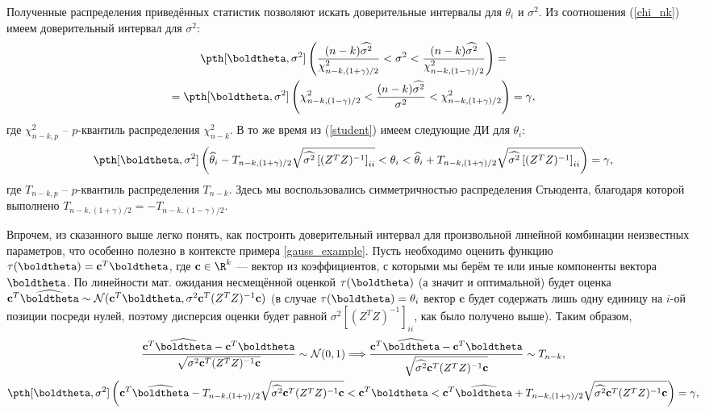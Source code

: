 Полученные распределения приведённых статистик позволяют искать доверительные интервалы для $\theta_i$ и $\sigma^2$. Из соотношения (\ref{chi_nk}) имеем доверительный интервал для $\sigma^2$:
\begin{gather*}
    \pth[\boldtheta, \sigma^2]\left(\frac{(n-k)\widehat{\sigma^2}}{\chi^2_{n-k, (1+\gamma)/2}} < \sigma^2 < \frac{(n-k)\widehat{\sigma^2}}{\chi^2_{n-k, (1-\gamma)/2}} \right) = \\
    = \pth[\boldtheta, \sigma^2]\left(\chi^2_{n-k, (1-\gamma)/2} < \frac{(n-k)\widehat{\sigma^2}}{\sigma^2} < \chi^2_{n-k, (1+\gamma)/2} \right)=\gamma,
\end{gather*}
где $\chi^2_{n-k, p}$ -- $p$-квантиль распределения $\chi^2_{n-k}$. В то же время из (\ref{student}) имеем следующие ДИ для $\theta_i$:
\begin{gather*}
    \pth[\boldtheta, \sigma^2]\left(\widehat{\theta}_i - T_{n-k,(1+\gamma)/2}\sqrt{\widehat{\sigma^2}\left[(Z^T Z)^{-1}\right]_{ii}} < \theta_i < \widehat{\theta}_i + T_{n-k, (1+\gamma)/2}\sqrt{\widehat{\sigma^2}\left[(Z^T Z)^{-1}\right]_{ii}} \right) =\gamma,
\end{gather*}
где $T_{n-k, p}$ -- $p$-квантиль распределения $T_{n-k}$. Здесь мы воспользовались симметричностью распределения Стьюдента, благодаря которой выполнено $T_{n-k, (1+\gamma)/2} = -T_{n-k, (1-\gamma)/2}$.

Впрочем, из сказанного выше легко понять, как построить доверительный интервал для произвольной линейной комбинации неизвестных параметров, что особенно полезно в контексте примера \ref{gauss_example}. Пусть необходимо оценить функцию $\tau(\boldtheta) = \mathbf c^T\boldtheta$, где $\mathbf c \in \R^k$ --- вектор из коэффициентов, с которыми мы берём те или иные компоненты вектора $\boldtheta$. По линейности мат. ожидания несмещённой оценкой $\tau(\boldtheta)$ (а значит и оптимальной) будет оценка $\mathbf c^T\widehat{\boldtheta} \sim \mathcal{N}(\mathbf c^T\boldtheta, \sigma^2 \mathbf c^T (Z^TZ)^{-1}\mathbf c)$ (в случае $\tau(\boldtheta) = \theta_i$ вектор $\mathbf c$ будет содержать лишь одну единицу на $i$-ой позиции посреди нулей, поэтому дисперсия оценки будет равной $\sigma^2\left[(Z^T Z)^{-1}\right]_{ii}$, как было получено выше). Таким образом,
\begin{gather*}
    \frac{\mathbf c^T\widehat{\boldtheta} - \mathbf c^T\boldtheta}{\sqrt{\sigma^2 \mathbf c^T (Z^TZ)^{-1}\mathbf c}}\sim \mathcal{N}(0, 1) \Longrightarrow \frac{\mathbf c^T\widehat{\boldtheta} - \mathbf c^T\boldtheta}{\sqrt{\widehat{\sigma^2} \mathbf c^T (Z^TZ)^{-1}\mathbf c}} \sim T_{n-k},\\
    \pth[\boldtheta, \sigma^2]\left(\mathbf c^T\widehat{\boldtheta} - T_{n-k,(1+\gamma)/2}\sqrt{\widehat{\sigma^2} \mathbf c^T (Z^TZ)^{-1}\mathbf c} < \mathbf c^T\boldtheta < \mathbf c^T\widehat{\boldtheta} + T_{n-k, (1+\gamma)/2}\sqrt{\widehat{\sigma^2} \mathbf c^T (Z^TZ)^{-1}\mathbf c} \right) =\gamma,
\end{gather*}


